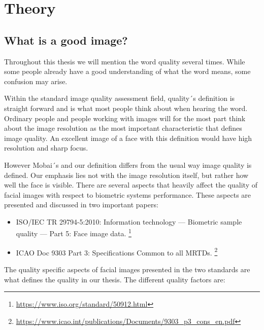\chapter{Theory}
\label{chap:usage}

\section{What is a good image?}
\label{sec:setup}
Throughout this thesis we will mention the word quality several times. While some people already have a good understanding of what the word means, some confusion may arise. 

Within the standard image quality assessment field, quality´s definition is straight forward and is what most people think about when hearing the word. Ordinary people and people working with images will for the most part think about the image resolution as the most important characteristic that defines image quality. An excellent image of a face with this definition would have high resolution and sharp focus.   

However Mobai´s and our definition differs from the usual way image quality is defined. Our emphasis lies not with the image resolution itself, but rather how well the face is visible. There are several aspects that heavily affect the quality of facial images with respect to biometric systems performance. These aspects are presented and discussed in two important papers: 

\begin{itemize}
    \item ISO/IEC TR 29794-5:2010: Information technology — Biometric sample quality — Part 5: Face image data. \footnote{\url{https://www.iso.org/standard/50912.html}}
    \item ICAO Doc 9303 Part 3: Specifications Common to all MRTDs. \footnote{\url{https://www.icao.int/publications/Documents/9303_p3_cons_en.pdf}}
\end{itemize}

The quality specific aspects of facial images presented in the two standards are what defines the quality in our thesis. The different quality factors are:  

